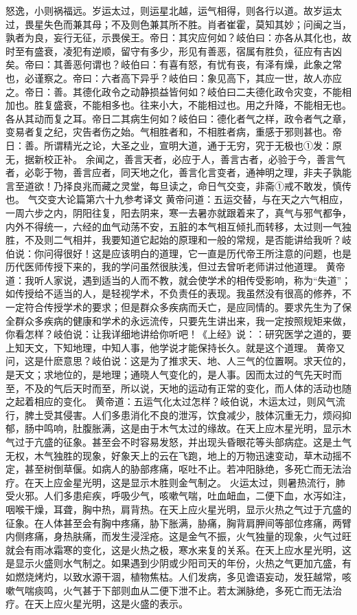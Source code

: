 \documentclass[a4paper,12pt,UTF8,twoside]{ctexbook}
\begin{document}
怒逸，小则祸福远。岁运太过，则运星北越，运气相得，则各行以道。故岁运太过，畏星失色而兼其母；不及则色兼其所不胜。肖者崔霍，莫知其妙；问闽之当，孰者为良，妄行无征，示畏侯王。帝日：其灾应何如？岐伯曰：亦各从其化也，故时至有盛衰，凌犯有逆顺，留守有多少，形见有善恶，宿属有胜负，征应有吉凶矣。帝曰：其善恶何谓也？岐伯曰：有喜有怒，有忧有丧，有泽有燥，此象之常也，必谨察之。帝曰：六者高下异乎？岐伯曰：象见高下，其应一世，故人亦应之。帝日：善。其德化政令之动静损益皆何如？岐伯曰二夫德化政令灾变，不能相加也。胜复盛衰，不能相多也。往来小大，不能相过也。用之升降，不能相无也。各从其动而复之耳。帝日二其病生何如？岐伯曰：德化者气之样，政令者气之章，变易者复之纪，灾告者伤之始。气相胜者和，不相胜者病，重感于邪则甚也。帝日：善。所谓精光之论，大圣之业，宣明大道，通于无穷，究于无极也①发：原无，据新校正补。
余闻之，善言天者，必应于人，善言古者，必验于今，善言气者，必彰于物，善言应者，同天地之化，善言化言变者，通神明之理，非夫子孰能言至道欲！乃择良兆而藏之灵堂，每旦读之，命日气交变，非斋①戒不敢发，慎传也。
气交变大论篇第六十九参考译文
黄帝问道：五运交替，与在天之六气相应，一周六步之内，阴阳往复，阳去阴来，寒一去暑亦就跟着来了，真气与邪气都争，内外不得统一，六经的血气动荡不安，五脏的本气相互倾扎而转移，太过则一气独胜，不及则二气相并，我要知道它起始的原理和一般的常规，是否能讲给我听？岐伯说：你问得很好！这是应该明白的道理，它一直是历代帝王所注意的问题，也是历代医师传授下来的，我的学问虽然很肤浅，但过去曾听老师讲过他道理。
黄帝道：我听人家说，遇到适当的人而不教，就会使学术的相传受影响，称为“失道”；如传授给不适当的人，是轻视学术，不负责任的表现。我虽然没有很高的修养，不一定符合传授学术的要求；但是群众多疾病而夭亡，是应同情的。要求先生为了保全群众多疾病的健康和学术的永远流传，只要先生讲出来，我一定按照规矩来做，你看怎样？岐伯说：让我详细地讲给你听吧！《上经》说：：研究医学之道的，要上知天文，下知地理，中知人事，他学说才能保持长久。就是这个道理。
黄帝又问，这是什麽意思？岐伯说：这是为了推求天、地、人三气的位置啊。求天位的，是天文；求地位的，是地理；通晓人气变化的，是人事。因而太过的气先天时而至，不及的气后天时而至，所以说，天地的运动有正常的变化，而人体的活动也随之起着相应的变化。
黄帝道：五运气化太过怎样？岐伯说，木运太过，则风气流行，脾土受其侵害。人们多患消化不良的泄泻，饮食减少，肢体沉重无力，烦闷抑郁，肠中鸣响，肚腹胀满，这是由于木气太过的缘故。在天上应木星光明，显示木气过于亢盛的征象。甚至会不时容易发怒，并出现头昏眼花等头部病症。这是土气无权，木气独胜的现象，好象天上的云在飞跑，地上的万物迅速变动，草木动摇不定，甚至树倒草偃。如病人的胁部疼痛，呕吐不止。若冲阳脉绝，多死亡而无法治疗。在天上应金星光明，这是显示木胜则金气制之。
火运太过，则暑热流行，肺受火邪。人们多患疟疾，呼吸少气，咳嗽气喘，吐血衄血，二便下血，水泻如注，咽喉干燥，耳聋，胸中热，肩背热。在天上应火星光明，显示火热之气过于亢盛的征象。在人体甚至会有胸中疼痛，胁下胀满，胁痛，胸背肩胛间等部位疼痛，两臂内侧疼痛，身热肤痛，而发生浸淫疮。这是金气不振，火气独量的现象，火气过旺就会有雨冰霜寒的变化，这是火热之极，寒水来复的关系。在天上应水星光明，这是显示火盛则水气制之。如果遇到少阴或少阳司天的年份，火热之气更加亢盛，有如燃烧烤灼，以致水源干涸，植物焦枯。人们发病，多见谵语妄动，发狂越常，咳嗽气喘痰鸣，火气甚于下部则血从二便下泄不止。若太渊脉绝，多死亡而无法治疗。在天上应火星光明，这是火盛的表示。
\end{document}
